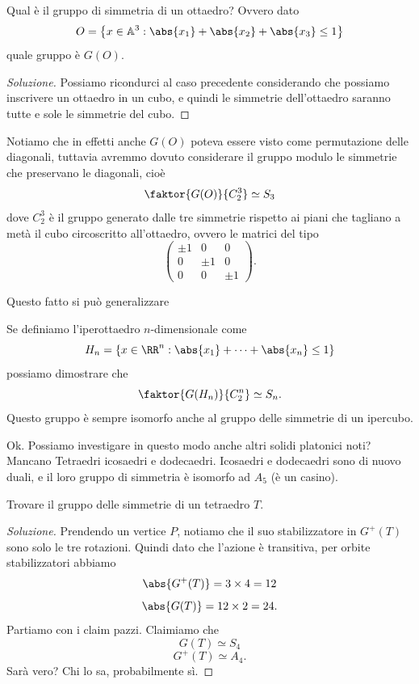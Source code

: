 \documentclass[11pt]{scrartcl}
\begin{document}
	\begin{example}
		Qual è il gruppo di simmetria di un ottaedro? Ovvero dato
		$$O=\left\{x\in\mathbb{A}^3:\abs{x_1}+\abs{x_2}+\abs{x_3}\le 1\right\}$$
		quale gruppo è $G(O)$.
	\end{example}
	\begin{proof}[Soluzione]
		Possiamo ricondurci al caso precedente considerando che possiamo inscrivere un ottaedro in un cubo, e quindi le simmetrie dell'ottaedro saranno tutte e sole le simmetrie del cubo. 
	\end{proof}
	\begin{remark}
		Notiamo che in effetti anche $G(O)$ poteva essere visto come permutazione delle diagonali, tuttavia avremmo dovuto considerare il gruppo modulo le simmetrie che preservano le diagonali, cioè
		$$\faktor{G(O)}{C_2^3}\simeq S_3$$
		dove $C_2^3$ è il gruppo generato dalle tre simmetrie rispetto ai piani che tagliano a metà il cubo circoscritto all'ottaedro, ovvero le matrici del tipo
		$$
		\begin{pmatrix}
			\pm 1 & 0 & 0 \\
			0 & \pm 1 & 0 \\
			0 & 0 & \pm 1
		\end{pmatrix}.
		$$
	\end{remark}
	Questo fatto si può generalizzare
	\begin{lemma}
		Se definiamo l'iperottaedro $n$-dimensionale come
		$$H_n=\left\{x\in \RR^n:\abs{x_1}+\dots+\abs{x_n}\le 1\right\}$$
		possiamo dimostrare che 
		$$\faktor{G(H_n)}{C_2^n}\simeq S_n.$$
		Questo gruppo è sempre isomorfo anche al gruppo delle simmetrie di un ipercubo.
	\end{lemma}
	Ok. Possiamo investigare in questo modo anche altri solidi platonici noti? Mancano Tetraedri icosaedri e dodecaedri. Icosaedri e dodecaedri sono di nuovo duali, e il loro gruppo di simmetria è isomorfo ad $A_5$ (è un casino). \\
	\begin{example}
		Trovare il gruppo delle simmetrie di un tetraedro $T$.
	\end{example} 
	\begin{proof}[Soluzione]
		Prendendo un vertice $P$, notiamo che il suo stabilizzatore in $G^+(T)$ sono solo le tre rotazioni. Quindi dato che l'azione è transitiva, per orbite stabilizzatori abbiamo 
		$$\abs{G^+(T)}=3\times 4=12$$
		$$\abs{G(T)}=12\times 2=24.$$
		Partiamo con i claim pazzi. Claimiamo che
		$$G(T)\simeq S_4$$
		$$G^+(T)\simeq A_4.$$
		Sarà vero? Chi lo sa, probabilmente sì.
	\end{proof}
	
\end{document}
